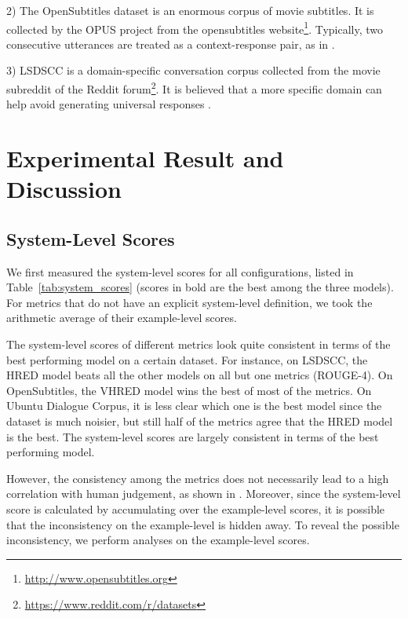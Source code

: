 \documentclass[conference]{IEEEtran}
\begin{document}
2) The OpenSubtitles dataset \cite{opensub} is an enormous corpus of movie subtitles.
It is collected by the OPUS project \cite{OPUS} from the opensubtitles website\footnote{\url{http://www.opensubtitles.org}}.
Typically, two consecutive utterances are treated as a context-response pair, as in \cite{GoogleChatbot,MMI}.

3) LSDSCC \cite{LSDSCC} is a domain-specific conversation corpus collected from the movie subreddit of the Reddit forum\footnote{\url{https://www.reddit.com/r/datasets}}.
It is believed that a more specific domain can help avoid generating universal responses \cite{LSDSCC}.


\section{Experimental Result and Discussion}
\subsection{System-Level Scores}
We first measured the system-level scores for all configurations, listed in Table~\ref{tab:system_scores} (scores in bold are the best among the three models).
For metrics that do not have an explicit system-level definition, we took the arithmetic average of their example-level scores.


The system-level scores of different metrics look quite consistent in terms of the best performing model on a certain dataset.
For instance, on LSDSCC, the HRED model beats all the other models on all but one metrics (ROUGE-4).
On OpenSubtitles, the VHRED model wins the best of most of the metrics.
On Ubuntu Dialogue Corpus, it is less clear which one is the best model since the dataset is much noisier,
but still half of the metrics agree that the HRED model is the best.
The system-level scores are largely consistent in terms of the best performing model.

However, the consistency among the metrics does not necessarily lead to a high correlation with human judgement, as shown in \cite{HowNot}.
Moreover, since the system-level score is calculated by accumulating over the example-level scores,
it is possible that the inconsistency on the example-level is hidden away.
To reveal the possible inconsistency, we perform analyses on the example-level scores.
\end{document}
